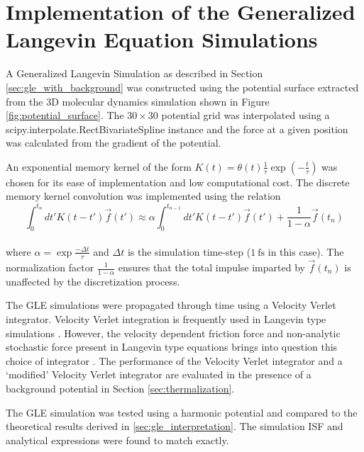 \section{Implementation of the Generalized Langevin Equation Simulations}

A Generalized Langevin Simulation as described in Section \ref{sec:gle_with_background} was constructed using the potential surface extracted from the 3D molecular dynamics simulation shown in Figure \ref{fig:potential_surface}. The $30\times30$ potential grid was interpolated using a scipy.interpolate.RectBivariateSpline \cite{2020SciPy-NMeth} instance and the force at a given position was calculated from the gradient of the potential. 

An exponential memory kernel of the form $K\left(t\right) = \theta(t)\frac{1}{\tau}\exp\left(-\frac{t}{\tau}\right)$ was chosen for its ease of implementation and low computational cost. The discrete memory kernel convolution was implemented using the relation
\\
$$
\int_0^{t_n} dt' K\left(t-t'\right) \vec{f}(t') \approx \alpha \int_0^{t_{n-1}} dt' K\left(t-t'\right) \vec{f}(t') + \frac{1}{1-\alpha} \vec{f}\left(t_n\right)
$$
\\
where $\alpha = \exp{\frac{-\Delta{t}}{\tau}}$ and $\Delta{t}$ is the simulation time-step ($\SI{1}{\femto\second}$ in this case). The normalization factor $\frac{1}{1-\alpha}$ ensures that the total impulse imparted by $\vec{f}(t_n)$ is unaffected by the discretization process. 

The GLE simulations were propagated through time using a Velocity Verlet integrator. Velocity Verlet integration is frequently used in Langevin type simulations \cite{Ward, Townsend}. However, the velocity dependent friction force and non-analytic stochastic force present in Langevin type equations brings into question this choice of integrator \cite{gronbech2013simple}. The performance of the Velocity Verlet integrator and a `modified' Velocity Verlet integrator \cite{Omelyan} are evaluated in the presence of a background potential in Section \ref{sec:thermalization}.

The GLE simulation was tested using a harmonic potential and compared to the theoretical results derived in \ref{sec:gle_interpretation}. The simulation ISF and analytical expressions were found to match exactly. 
